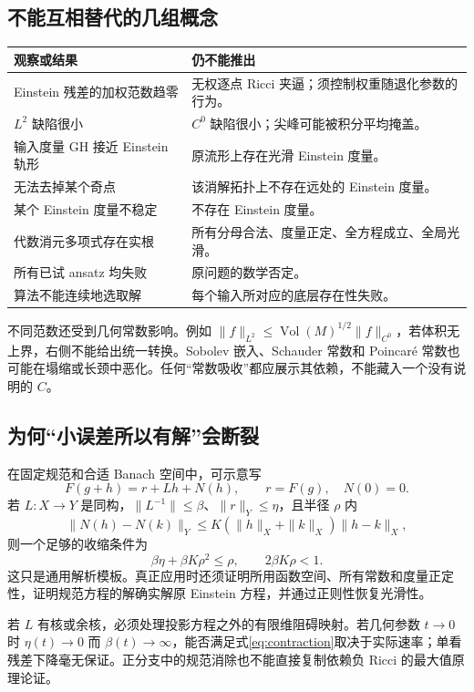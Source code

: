 \documentclass[11pt,a4paper]{article}
\theoremstyle{definition}
\newcommand{\Vol}{\operatorname{Vol}}
\begin{document}
\subsection{不能互相替代的几组概念}

\begin{longtable}{P{0.36\textwidth}P{0.57\textwidth}}
\toprule
观察或结果 & 仍不能推出\\\midrule
Einstein 残差的加权范数趋零 & 无权逐点 Ricci 夹逼；须控制权重随退化参数的行为。\\
$L^2$ 缺陷很小 & $C^0$ 缺陷很小；尖峰可能被积分平均掩盖。\\
输入度量 GH 接近 Einstein 轨形 & 原流形上存在光滑 Einstein 度量。\\
无法去掉某个奇点 & 该消解拓扑上不存在远处的 Einstein 度量。\\
某个 Einstein 度量不稳定 & 不存在 Einstein 度量。\\
代数消元多项式存在实根 & 所有分母合法、度量正定、全方程成立、全局光滑。\\
所有已试 ansatz 均失败 & 原问题的数学否定。\\
算法不能连续地选取解 & 每个输入所对应的底层存在性失败。\\\bottomrule
\end{longtable}

不同范数还受到几何常数影响。例如 $\|f\|_{L^2}\le\Vol(M)^{1/2}\|f\|_{C^0}$，若体积无上界，右侧不能给出统一转换。Sobolev 嵌入、Schauder 常数和 Poincaré 常数也可能在塌缩或长颈中恶化。任何“常数吸收”都应展示其依赖，不能藏入一个没有说明的 $C$。

\subsection{为何“小误差所以有解”会断裂}

在固定规范和合适 Banach 空间中，可示意写
\[
F(g+h)=r+Lh+N(h),\qquad r=F(g),\quad N(0)=0.
\]
若 $L:X\to Y$ 是同构，$\|L^{-1}\|\le\beta$、$\|r\|_Y\le\eta$，且半径 $\rho$ 内
\[
\|N(h)-N(k)\|_Y\le K(\|h\|_X+\|k\|_X)\|h-k\|_X,
\]
则一个足够的收缩条件为
\begin{equation}\label{eq:contraction}
\beta\eta+\beta K\rho^2\le\rho,\qquad2\beta K\rho<1.
\end{equation}
这只是通用解析模板。真正应用时还须证明所用函数空间、所有常数和度量正定性，证明规范方程的解确实解原 Einstein 方程，并通过正则性恢复光滑性。

若 $L$ 有核或余核，必须处理投影方程之外的有限维阻碍映射。若几何参数 $t\to0$ 时 $\eta(t)\to0$ 而 $\beta(t)\to\infty$，能否满足式\eqref{eq:contraction}取决于实际速率；单看残差下降毫无保证。正分支中的规范消除也不能直接复制依赖负 Ricci 的最大值原理论证。
\end{document}
